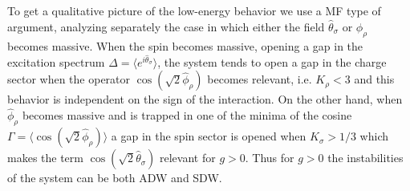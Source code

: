 \documentclass[pra,aps,superscriptaddress,twocolumn]{revtex4}
\begin{document}
To get a qualitative picture of the low-energy behavior we use a MF type
of argument, analyzing separately the case in which either the field $\hat \theta_\sigma$ or $\hat \phi_\rho$ becomes massive.
When the spin becomes massive, opening a gap in the excitation spectrum $\Delta= \langle e^{i \hat \theta_\sigma}\rangle$,
the system tends to open a gap in the charge sector when the operator $\cos (\sqrt{2} \hat \phi_\rho)$ becomes relevant,
i.e. $K_\rho <3$ and this behavior is independent on the sign of the interaction.
On the other hand, when $\hat \phi_\rho$ becomes massive and is trapped in one of the minima
of the cosine $\Gamma=\langle \cos(\sqrt 2 \hat \phi_\rho)\rangle$ a gap in the spin sector is opened when $K_\sigma>1/3$
which makes the term $\cos (\sqrt{2} \hat \theta_\sigma)$ relevant for $g>0$.
Thus for $g>0$ the instabilities of the system can be both ADW and SDW.
\end{document}
